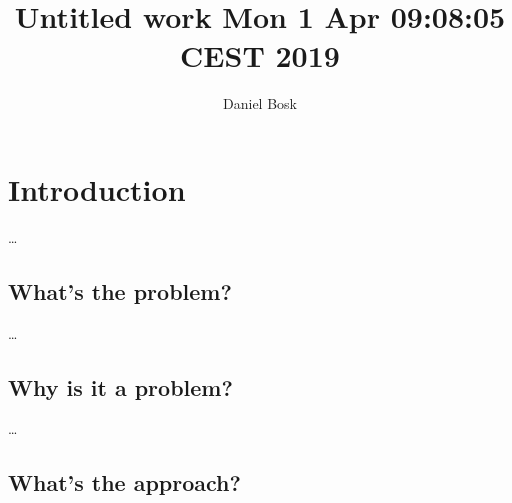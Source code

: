 \title{%
  Untitled work Mon  1 Apr 09:08:05 CEST 2019
}
\author{Daniel Bosk}


\mode*

\begin{abstract}
  
\end{abstract}


\section{Introduction}

\dots

\subsection{What's the problem?}

\dots


\subsection{Why is it a problem?}

\dots


\subsection{What's the approach?}

